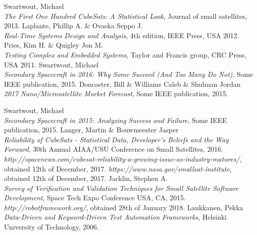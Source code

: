 \documentclass[english,12pt,a4paper,pdftex,elec,utf8]{aaltothesis}
\begin{document}
{}
\begin{thebibliography}{99}

 Swartwout, Michael\\
  \textit{The First One Hundred CubeSats: A Statistical Look}, Journal of small satellites, 2013.
 Laplante, Phillip A. \& Ovaska Seppo J.\\
  \textit{Real-Time Systems Design and Analysis}, 4th edition, IEEE Press, USA 2012.
 Pries, Kim H. \& Quigley Jon M.\\
  \textit{Testing Complex and Embedded Systems}, Taylor and Francis group, CRC Press, USA 2011.  
 Swartwout, Michael\\
  \textit{Secondary Spacecraft in 2016: Why Some Succeed (And Too Many Do Not)}, Some IEEE publication, 2015.
 Doncaster, Bill \& Williams Caleb \& Shulman Jordan\\
  \textit{2017 Nano/Microsatellite Market Forecast}, Some IEEE publication, 2015.

 Swartwout, Michael\\
  \textit{Secondary Spacecraft in 2015: Analyzing Success and Failure}, Some IEEE publication, 2015.
 Langer, Martin \& Bouwmeester Jasper\\
  \textit{Reliability of CubeSats - Statistical Data, Developer's Beliefs and the Way Forward}, 30th Annual AIAA/USU Conference on Small Satellites, 2016.
  \textit{http://spacenews.com/cubesat-reliability-a-growing-issue-as-industry-matures/}, obtained 12th of December, 2017.  
  \textit{https://www.nasa.gov/smallsat-institute}, obtained 12th of December, 2017. 
 Jacklin, Stephen A.\\
  \textit{Survey of Verification and Validation Techniques for Small Satellite Software Development}, Space Tech Expo Conference USA, CA, 2015.
  \textit{http://robotframework.org/}, obtained 28th of January 2018.
 Laukkanen, Pekka\\
  \textit{Data-Driven and Keyword-Driven Test Automation Frameworks}, Helsinki University of Technology, 2006.  


\end{thebibliography}
\end{document}
